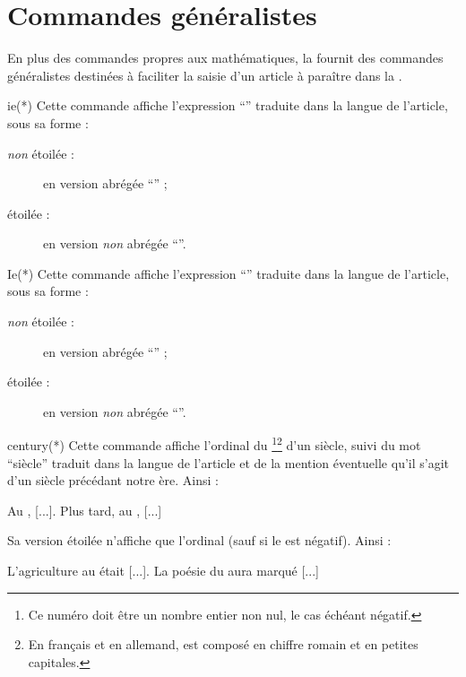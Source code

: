 \documentclass[french,nolocaltoc]{nwejmart}
\newtheorem[title=Fait,style=definition]{fact}
\begin{document}
\section{Commandes généralistes}
\label{sec:comm-gener}

En plus des commandes propres aux mathématiques, la \nwejmauthorcl{} fournit des
commandes généralistes destinées à faciliter la saisie d'un article à paraître
dans la \nwejm{}.

\begin{docCommand}{ie(*)}{}
  Cette commande affiche l'expression \enquote{\ie*{}} traduite dans la langue
  de l'article, sous sa forme :
  \begin{description}
  \item[\emph{non} étoilée :] en version abrégée \enquote{\ie{}} ;
  \item[étoilée :] en version \emph{non} abrégée \enquote{\ie*{}}.
  \end{description}
\end{docCommand}

\begin{docCommand}{Ie(*)}{}
  Cette commande affiche l'expression \enquote{\Ie*{}} traduite dans la langue
  de l'article, sous sa forme :
  \begin{description}
  \item[\emph{non} étoilée :] en version abrégée \enquote{\Ie{}} ;
  \item[étoilée :] en version \emph{non} abrégée \enquote{\Ie*{}}.
  \end{description}
\end{docCommand}

\begin{docCommand}{century(*)}{}
  Cette commande affiche l'ordinal du \footnote{Ce numéro doit être
    un nombre entier non nul, le cas échéant négatif.}\footnote{En français et en
    allemand,  est composé en chiffre romain et en petites
    capitales.} d'un siècle, suivi du mot \enquote{siècle} traduit dans la
  langue de l'article et de la mention éventuelle qu'il s'agit d'un siècle
  précédant notre ère. Ainsi :
\begin{bodycode}
Au , [...]. Plus tard, au , [...]
\end{bodycode}
  Sa version étoilée n'affiche que l'ordinal (sauf si le  est
  négatif). Ainsi :
\begin{bodycode}
L'agriculture au  était [...].
La poésie du  aura marqué [...]
\end{bodycode}
\end{docCommand}
\end{document}
